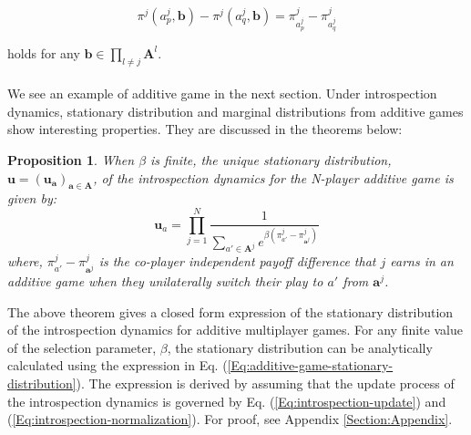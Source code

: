 \documentclass[11pt]{article}
\theoremstyle{plainCl1}
\newtheorem{Prop}{Proposition}
\theoremstyle{plainCl2}
\newcommand{\A}{\mathbf{A}}
\newcommand{\abf}{\mathbf{a}}
\newcommand{\ubf}{\mathbf{u}}
\begin{document}
\begin{equation}
\pi^j(a^j_p, \mathbf{b}) - \pi^j(a^j_q, \mathbf{b}) = \pi^j_{a^j_p} - \pi^j_{a^j_q}
\label{Eq:additive games property}
\end{equation}

\noindent holds for any $\mathbf{b} \in \prod_{l \neq j} \A^l$. 
\\ \\
We see an example of additive game in the next section. Under introspection dynamics, stationary distribution and marginal distributions from additive games show interesting properties. They are discussed in the theorems below: 

\begin{Prop}
When $\beta$ is finite, the unique stationary distribution, $\ubf = (\ubf_\abf)_{\abf \in \A}$, of the introspection dynamics for the N-player additive game is given by: 
\begin{equation}
\ubf_a = \prod_{j=1}^N \frac{1}{\displaystyle \sum_{a' \in \A^j} e^{\beta \left( \pi^j_{a'} -  \pi^j_{\abf^j} \right) }} 
\label{Eq:additive-game-stationary-distribution}
\end{equation}
where, $\pi^j_{a'} - \pi^j_{\abf^j}$ is the co-player independent payoff difference that $j$  earns in an additive game when they unilaterally switch their play to $a'$ from $\abf^j$.
\label{Th:additive-games-stationary-dist}
\end{Prop}
\noindent The above theorem gives a closed form expression of the stationary distribution of the introspection dynamics for additive multiplayer games. For any finite value of the selection parameter, $\beta$, the stationary distribution can be analytically calculated using the expression in Eq. (\ref{Eq:additive-game-stationary-distribution}). The expression is derived by assuming that the update process of the introspection dynamics is governed by Eq. (\ref{Eq:introspection-update}) and (\ref{Eq:introspection-normalization}). For proof, see Appendix \ref{Section:Appendix}.
\end{document}
